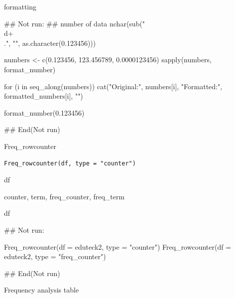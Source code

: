 \documentclass[a4paper]{book}
\begin{document}
%
\begin{Value}
formatting
\end{Value}
%
\begin{Examples}
\begin{ExampleCode}
## Not run: 
## number of data
nchar(sub("\\d+\\.", "", as.character(0.123456)))

numbers <- c(0.123456, 123.456789, 0.0000123456)
sapply(numbers, format_number)

for (i in seq_along(numbers)) {
   cat("Original:", numbers[i], "Formatted:", formatted_numbers[i], "\n")}

format_number(0.123456)


## End(Not run)

\end{ExampleCode}
\end{Examples}
%
\begin{Description}
Freq\_rowcounter
\end{Description}
%
\begin{Usage}
\begin{verbatim}
Freq_rowcounter(df, type = "counter")
\end{verbatim}
\end{Usage}
%
\begin{Arguments}
\begin{ldescription}
\item[\code{df}] df

\item[\code{type}] counter, term, freq\_counter, freq\_term
\end{ldescription}
\end{Arguments}
%
\begin{Value}
df
\end{Value}
%
\begin{Examples}
\begin{ExampleCode}
## Not run: 

 Freq_rowcounter(df = eduteck2, type = "counter")
Freq_rowcounter(df = eduteck2, type = "freq_counter")

## End(Not run)
\end{ExampleCode}
\end{Examples}
%
\begin{Description}
Frequency analysis table
\end{Description}
\end{document}
